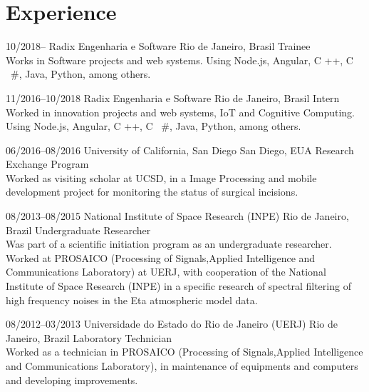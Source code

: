 \documentclass[]{friggeri-cv} %
\begin{document}
\section{Experience}

\begin{entrylist}


\entry
{10/2018--}
{\hspace{.15cm} Radix Engenharia e Software}
{Rio de Janeiro, Brasil}
{Trainee \\
Works in Software projects and web systems. Using Node.js, Angular, C ++, C \ #, Java, Python, among others.}

\entry
{11/2016--10/2018}
{\hspace{.15cm} Radix Engenharia e Software}
{Rio de Janeiro, Brasil}
{Intern \\
Worked in innovation projects and web systems, IoT and Cognitive Computing. Using Node.js, Angular, C ++, C \ #, Java, Python, among others.}

\entry
{06/2016--08/2016}
{\hspace{.15cm} University of California, San Diego}
{San Diego, EUA}
{Research Exchange Program \\
Worked as visiting scholar at UCSD, in a Image Processing and mobile development project for monitoring the status of surgical incisions.}


\entry
{08/2013--08/2015}
{\hspace{.15cm}National Institute of Space Research (INPE)}
{Rio de Janeiro, Brazil}
{Undergraduate Researcher \\
Was part of a scientific initiation program as an undergraduate researcher. Worked at PROSAICO (Processing of Signals,Applied Intelligence and Communications Laboratory) at UERJ, with cooperation of the National Institute of Space Research (INPE) in a specific research of spectral filtering of high frequency noises in the Eta atmospheric model data.}

\end{entrylist}

\begin{entrylist}
\entry
{08/2012--03/2013}
{\hspace{.15cm}Universidade do Estado do Rio de Janeiro (UERJ)}
{Rio de Janeiro, Brazil}
{Laboratory Technician \\
Worked as a technician in PROSAICO (Processing of Signals,Applied Intelligence and Communications Laboratory), in maintenance of equipments and computers and developing improvements.}

\end{entrylist}
\end{document}
